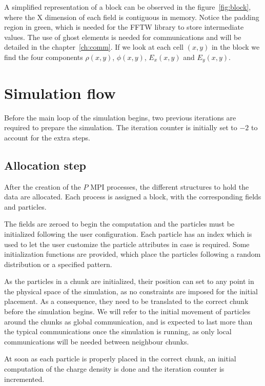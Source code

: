A simplified representation of a block can be observed in the 
figure~\ref{fig:block}, where the X dimension of each field is contiguous in 
memory.  Notice the padding region in green, which is needed for the FFTW 
library to store intermediate values. The use of ghost elements is needed for 
communications and will be detailed in the chapter~\ref{ch:comm}. If we look at 
each cell $(x,y)$ in the block we find the four components $\rho(x,y)$, 
$\phi(x,y)$, $E_x(x,y)$ and $E_y(x,y)$.

\section{Simulation flow}

Before the main loop of the simulation begins, two previous iterations are 
required to prepare the simulation. The iteration counter is initially set to 
$-2$ to account for the extra steps.

\subsection{Allocation step}

After the creation of the $P$ MPI processes, the different structures to hold 
the data are allocated. Each process is assigned a block, with the corresponding 
fields and particles.

The fields are zeroed to begin the computation and the particles must be 
initialized following the user configuration. Each particle has an index which 
is used to let the user customize the particle attributes in case is required.  
Some initialization functions are provided, which place the particles following 
a random distribution or a specified pattern.

As the particles in a chunk are initialized, their position can set to any point 
in the physical space of the simulation, as no constraints are imposed for the 
initial placement. As a consequence, they need to be translated to the correct 
chunk before the simulation begins. We will refer to the initial movement of 
particles around the chunks as global communication, and is expected to last 
more than the typical communications once the simulation is running, as only 
local communications will be needed between neighbour chunks.

At soon as each particle is properly placed in the correct chunk, an initial 
computation of the charge density is done and the iteration counter is 
incremented.

